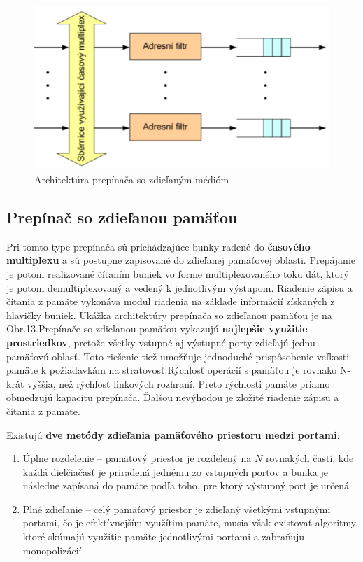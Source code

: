 \begin{figure}[ht]
\centering
  \begin{center}
    \includegraphics[scale=0.8]{images/zdiel_medium.png}
  \end{center}
  \caption[Architektúra prepínača so zdieľaným médióm]{Architektúra prepínača so zdieľaným médióm}
\end{figure}

\newpage
\subsection{Prepínač so zdieľanou pamäťou}
Pri tomto type prepínača sú prichádzajúce bunky radené do \textbf{časového multiplexu} a sú postupne zapisované do zdieľanej pamäťovej oblasti. Prepájanie je potom realizované čítaním buniek vo forme multiplexovaného toku dát, ktorý je potom demultiplexovaný a vedený k jednotlivým výstupom. Riadenie zápisu a čítania z pamäte vykonáva modul riadenia na základe informácií získaných z hlavičky buniek. Ukážka architektúry prepínača so zdieľanou pamäťou je na Obr.13.Prepínače so zdieľanou pamäťou vykazujú \textbf{najlepšie využitie prostriedkov}, pretože všetky vstupné aj výstupné porty zdieľajú jednu pamäťovú oblasť. Toto riešenie tiež umožňuje jednoduché prispôsobenie veľkosti pamäte k požiadavkám na stratovosť.Rýchlosť operácií s pamäťou je rovnako N-krát vyššia, než rýchlosť linkových rozhraní. Preto rýchlosti pamäte priamo obmedzujú kapacitu prepínača. Ďalšou nevýhodou je zložité riadenie zápisu a čítania z pamäte.\newline


Existujú \textbf{dve metódy zdieľania pamäťového priestoru medzi portami}:
\begin{enumerate}
    \item Úplne rozdelenie -- pamäťový priestor je rozdelený na $N$ rovnakých častí, kde každá dielčiačasť je priradená jednému zo vstupných portov a bunka je následne zapísaná do pamäte podľa toho, pre ktorý výstupný port je určená
    \item Plné zdieľanie -- celý pamäťový priestor je zdieľaný všetkými vstupnými portami, čo je efektívnejším využítim pamäte, musia však existovať algoritmy, ktoré skúmajú využitie pamäte jednotlivými portami a zabraňuju monopolizácií
\end{enumerate}

